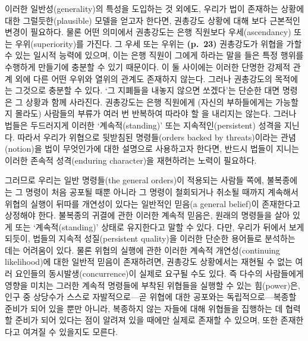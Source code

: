 이러한 일반성(generality)의 특성을 도입하는 것 외에도, 우리가 법이
존재하는 상황에 대한 그럴듯한(plausible) 모델을 얻고자 한다면, 권총강도
상황에 대해 보다 근본적인 변경이 필요하다. 물론 어떤 의미에서 권총강도는
은행 직원보다 우세(ascendancy) 또는 우위(superiority)를 가진다. 그 우세
또는 우위는 \textbf{(p.~23)} 권총강도가 위협을 가할 수 있는 일시적
능력에 있으며, 이는 은행 직원이 그에게 하라는 말을 들은 특정 행위를
수행하게 만들기에 충분할 수 있기 때문이다. 이 둘 사이에는 이러한 단명한
강제적 관계 외에 다른 어떤 우위와 열위의 관계도 존재하지 않는다. 그러나
권총강도의 목적에는 그것으로 충분할 수 있다. ‘그 지폐들을 내놓지 않으면
쏘겠다’는 단순한 대면 명령은 그 상황과 함께 사라진다. 권총강도는 은행
직원에게 (자신의 부하들에게는 가능할지 몰라도) 사람들의 부류가 여러 번
반복하여 따라야 할 을 내리지는
않는다. 그러나 법들은 두드러지게 이러한 ‘계속적(standing)’ 또는
지속적인(persistent) 성격을 지닌다. 따라서 우리가 위협으로 뒷받침된
명령들(orders backed by threats)이라는 관념(notion)을 법이 무엇인가에
대한 설명으로 사용하고자 한다면, 반드시 법들이 지니는 이러한 존속적
성격(enduring character)을 재현하려는 노력이 필요하다.

그러므로 우리는 일반 명령들(the general orders)이 적용되는 사람들 쪽에,
불복종에는 그 명령이 처음 공포될 때뿐 아니라 그 명령이 철회되거나 취소될
때까지 계속해서 위협의 실행이 뒤따를 개연성이 있다는 일반적인 믿음(a
general belief)이 존재한다고 상정해야 한다. 불복종의 귀결에 관한 이러한
계속적 믿음은, 원래의 명령들을 살아 있게 또는 ‘계속적(standing)’ 상태로
유지한다고 말할 수 있다. 다만, 우리가 뒤에서 보게 되듯이, 법들의 지속적
성질(persistent quality)을 이러한 단순한 용어들로 분석하는 데는 어려움이
있다. 물론 위협의 실행에 관한 이러한 계속적 개연성(continuing
likelihood)에 대한 일반적 믿음이 존재하려면, 권총강도 상황에서는 재현될
수 없는 여러 요인들의 동시발생(concurrence)이 실제로 요구될 수도 있다.
즉 다수의 사람들에게 영향을 미치는 그러한 계속적 명령들에 부착된
위협들을 실행할 수 있는 힘(power)은, 인구 중 상당수가 스스로
자발적으로---곧 위협에 대한 공포와는 독립적으로---복종할 준비가 되어
있을 뿐만 아니라, 복종하지 않는 자들에 대해 위협들을 집행하는 데 협력할
준비가 되어 있다는 점이 알려져 있을 때에만 실제로 존재할 수 있으며, 또한
존재한다고 여겨질 수 있을지도 모른다.

